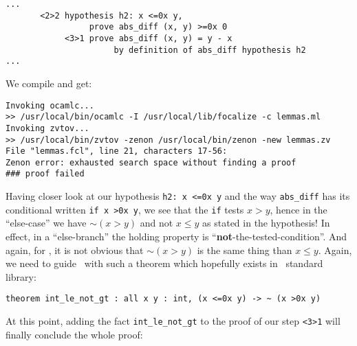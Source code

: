 \documentclass[11pt,a4paper,twoside,onecolumn,fullpage]{article}
\begin{document}
{\scriptsize
\begin{lstlisting}
...
       <2>2 hypothesis h2: x <=0x y,
                 prove abs_diff (x, y) >=0x 0
            <3>1 prove abs_diff (x, y) = y - x
                      by definition of abs_diff hypothesis h2
...
\end{lstlisting}}

We compile and get:

{\scriptsize
\begin{verbatim}
Invoking ocamlc...
>> /usr/local/bin/ocamlc -I /usr/local/lib/focalize -c lemmas.ml
Invoking zvtov...
>> /usr/local/bin/zvtov -zenon /usr/local/bin/zenon -new lemmas.zv
File "lemmas.fcl", line 21, characters 17-56:                
Zenon error: exhausted search space without finding a proof
### proof failed
\end{verbatim}}

Having closer look at our hypothesis \lstinline"h2: x <=0x y" and the
way \lstinline"abs_diff" has its conditional written
\lstinline"if x >0x y", we see that the \lstinline"if" tests $x >y$,
hence in the ``else-case'' we have $\sim (x >y)$ and not $x \le y$ as
stated in the hypothesis! In effect, in a ``else-branch'' the holding
property is ``{\bf not}-the-tested-condition''. And again, for \zenon,
it is not obvious that $\sim (x >y)$ is the same thing than $x \le y$.
Again, we need to guide \zenon\ with such a theorem which hopefully
exists in \focal\ standard library:

{\scriptsize
\begin{lstlisting}
theorem int_le_not_gt : all x y : int, (x <=0x y) -> ~ (x >0x y)
\end{lstlisting}}

At this point, adding the fact \lstinline"int_le_not_gt" to the proof
of our step \lstinline"<3>1" will finally conclude the whole proof:

{\scriptsize
}



\end{document}
